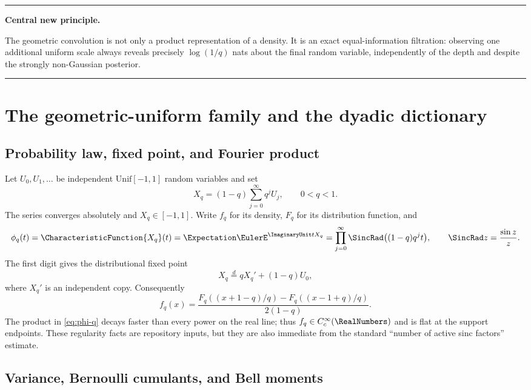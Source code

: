\documentclass[11pt,oneside]{article}
\theoremstyle{definition}
\theoremstyle{remark}
\newenvironment{resultbox}[1][Frontier result]{%
  \par\medskip\noindent
  \begin{center}\begin{minipage}{0.94\textwidth}
  \color{black}\hrule\vspace{0.55em}
  \textbf{#1.}\quad
}{%
  \vspace{0.55em}\hrule
  \end{minipage}\end{center}\medskip
}
\begin{document}
\begin{resultbox}[Central new principle]
The geometric convolution is not only a product representation of a density.  It
is an exact equal-information filtration: observing one additional uniform scale
always reveals precisely $\log(1/q)$ nats about the final random variable,
independently of the depth and despite the strongly non-Gaussian posterior.
\end{resultbox}

\section{The geometric-uniform family and the dyadic dictionary}
\label{sec:family}

\subsection{Probability law, fixed point, and Fourier product}

Let $U_0,U_1,\ldots$ be independent $\mathrm{Unif}[-1,1]$ random variables and set
\begin{equation}
 X_q=(1-q)\sum_{j=0}^{\infty}q^jU_j,
 \qquad 0<q<1.
 \label{eq:Xq}
\end{equation}
The series converges absolutely and $X_q\in[-1,1]$.  Write $f_q$ for its density,
$F_q$ for its distribution function, and
\begin{equation}
 \phi_q(t)=\CharacteristicFunction{X_q}(t)
 =\Expectation\EulerE^{\ImaginaryUnit tX_q}
 =\prod_{j=0}^{\infty}\SincRad\bigl((1-q)q^jt\bigr),
 \qquad \SincRad z=\frac{\sin z}{z}.
 \label{eq:phi-q}
\end{equation}
The first digit gives the distributional fixed point
\begin{equation}
 X_q\stackrel d=qX_q'+(1-q)U_0,
 \label{eq:fixedpoint}
\end{equation}
where $X_q'$ is an independent copy.  Consequently
\begin{equation}
 f_q(x)=\frac{F_q((x+1-q)/q)-F_q((x-1+q)/q)}{2(1-q)}.
 \label{eq:density-transfer}
\end{equation}
The product in \eqref{eq:phi-q} decays faster than every power on the real line;
thus $f_q\in C_c^\infty(\RealNumbers)$ and is flat at the support endpoints.  These regularity
facts are repository inputs, but they are also immediate from the standard
``number of active sinc factors'' estimate.

\subsection{Variance, Bernoulli cumulants, and Bell moments}
\end{document}
